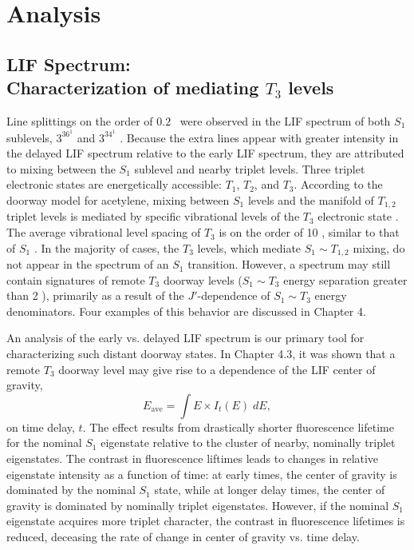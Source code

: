 \documentclass[12pt]{mitthesis}
\begin{document}
\section{Analysis}

\subsection{LIF Spectrum: \\Characterization of mediating $T_3$
  levels}

Line splittings on the order of $0.2$ \rcm\ were observed in the LIF
spectrum of both $S_1$ sublevels, $3^36^1$  and $3^34^1$ .
Because the extra lines appear with greater intensity in the delayed
LIF spectrum relative to the early LIF spectrum, they are attributed
to mixing between the $S_1$ sublevel and nearby triplet levels.  Three
triplet electronic states are energetically accessible: $T_1$, $T_2$,
and $T_3$.  According to the doorway model for acetylene, mixing
between $S_1$ levels and the manifold of $T_{1,2}$ triplet levels is
mediated by specific vibrational levels of the $T_3$ electronic state
\cite{dupre91, dupre95a, dupre95b, humphrey97, altunata00, mishra04}.
The average vibrational level spacing of $T_3$ is on the order of 10
\rcm, similar to that of $S_1$ \cite{thom07}.  In the majority of
cases, the $T_3$ levels, which mediate $S_1 \sim T_{1,2}$ mixing, do
not appear in the spectrum of an $S_1$ transition.  However, a
spectrum may still contain signatures of remote $T_3$ doorway
levels ($S_1 \sim T_3$ energy separation greater than 2 \rcm),
primarily as a result of the $J'$-dependence of $S_1 \sim T_3$ energy
denominators.  Four examples of this behavior are discussed in Chapter
4.

An analysis of the early vs. delayed LIF spectrum is our primary tool
for characterizing such distant doorway states.  In Chapter 4.3, it was
shown that a remote $T_3$ doorway level may give rise to a dependence of
the LIF center of gravity,
\begin{equation}
  E_{\text{ave}} = \int E \times I_t(E) \; dE,
\end{equation}
on time delay, $t$.  The effect results from drastically shorter
fluorescence lifetime for the nominal $S_1$ eigenstate relative to the
cluster of nearby, nominally triplet eigenstates.  The contrast in
fluorescence liftimes leads to changes in relative eigenstate
intensity as a function of time: at early times, the center of gravity
is dominated by the nominal $S_1$ state, while at longer delay times,
the center of gravity is dominated by nominally triplet eigenstates.
However, if the nominal $S_1$ eigenstate acquires more triplet
character, the contrast in fluorescence lifetimes is reduced,
deceasing the rate of change in center of gravity vs. time delay.
\end{document}
